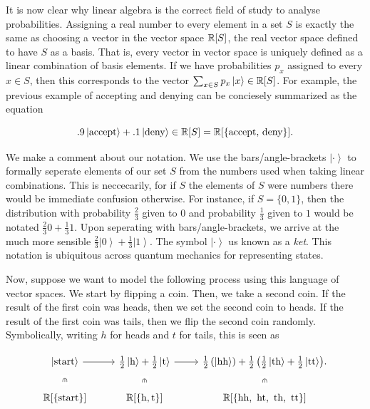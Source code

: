 \documentclass{article}
\theoremstyle{definition}
\numberwithin{figure}{section}
\begin{document}
It is now clear why linear algebra is the correct field of study to analyse probabilities. Assigning a real number to every element in a set $S$ is exactly the same as choosing a vector in the vector space $\mathbb{R}[S]$, the real vector space defined to have $S$ as a basis. That is, every vector in vector space is uniquely defined as a linear combination of basis elements. If we have probabilities $p_x$ assigned to every $x\in S$, then this corresponds to the vector $\sum_{x\in S}p_x\left |x\right>\in \mathbb{R}[S]$. For example, the previous example of accepting and denying can be conciesely summarized as the equation

$$.9\left|\text{accept}\right>+.1\left|\text{deny}\right>\in \mathbb{R}[S]=\mathbb{R}[\{\text{accept},\,\text{deny}\}].$$

We make a comment about our notation. We use the bars/angle-brackets $\left| \cdot \right>$ to formally seperate elements of our set $S$ from the numbers used when taking linear combinations. This is neccecarily, for if $S$ the elements of $S$ were numbers there would be immediate confusion otherwise. For instance, if $S=\{0,1\}$, then the distribution with probability $\frac{2}{3}$ given to $0$ and  probability $\frac{1}{3}$ given to $1$ would be notated $\frac{2}{3}0+\frac{1}{3}1$. Upon seperating with bars/angle-brackets, we arrive at the much more sensible $\frac{2}{3}\left|0\right>+\frac{1}{3}\left|1\right>$. The symbol $\left|\cdot \right>$ us known as a \textit{ket}. This notation is ubiquitous across quantum mechanics for representing states.

Now, suppose we want to model the following process using this language of vector spaces. We start by flipping a coin. Then, we take a second coin. If the result of the first coin was heads, then we set the second coin to heads. If the result of the first coin was tails, then we flip the second coin randomly. Symbolically, writing $h$ for heads and $t$ for tails, this is seen as

\[\begin{tikzcd}
	{\left|\text{start}\right>} & {\frac{1}{2}\left|\text{h}\right>+\frac{1}{2}\left|\text{t}\right>} & {\frac{1}{2}\left(\left|\text{hh}\right>\right)+\frac{1}{2}\left(\frac{1}{2}\left|\text{th}\right>+\frac{1}{2}\left|\text{tt}\right>\right)}. \\
	{\mathbb{R}[\{\text{start}\}]} & {\mathbb{R}[\{\text{h},\text{t}\}]} & {\mathbb{R}[\{\text{hh,\, ht,\, th,\, tt}\}]}
	\arrow[from=1-1, to=1-2]
	\arrow[from=1-2, to=1-3]
	\arrow["\vin"{description}, draw=none, from=1-1, to=2-1]
	\arrow["\vin"{description}, draw=none, from=1-2, to=2-2]
	\arrow["\vin"{description}, draw=none, from=1-3, to=2-3]
\end{tikzcd}\]
\end{document}
